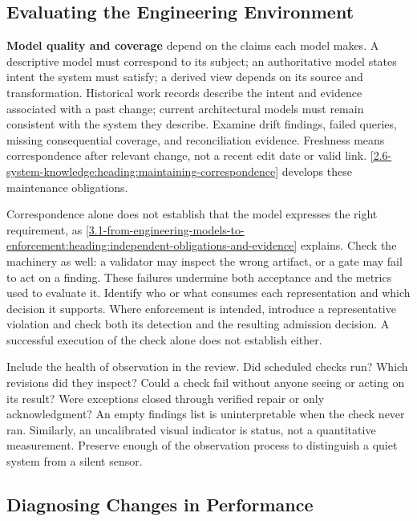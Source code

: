 \subsection{Evaluating the Engineering Environment}\label{heading:evaluating-the-engineering-environment}

\textbf{Model quality and coverage} depend on the claims each model makes. A descriptive model must correspond to its subject; an authoritative model states intent the system must satisfy; a derived view depends on its source and transformation. Historical work records describe the intent and evidence associated with a past change; current architectural models must remain consistent with the system they describe. Examine drift findings, failed queries, missing consequential coverage, and reconciliation evidence. Freshness means correspondence after relevant change, not a recent edit date or valid link. \autoref{2.6-system-knowledge:heading:maintaining-correspondence} develops these maintenance obligations.

Correspondence alone does not establish that the model expresses the right requirement, as \autoref{3.1-from-engineering-models-to-enforcement:heading:independent-obligations-and-evidence} explains. Check the machinery as well: a validator may inspect the wrong artifact, or a gate may fail to act on a finding. These failures undermine both acceptance and the metrics used to evaluate it. Identify who or what consumes each representation and which decision it supports. Where enforcement is intended, introduce a representative violation and check both its detection and the resulting admission decision. A successful execution of the check alone does not establish either.

Include the health of observation in the review. Did scheduled checks run? Which revisions did they inspect? Could a check fail without anyone seeing or acting on its result? Were exceptions closed through verified repair or only acknowledgment? An empty findings list is uninterpretable when the check never ran. Similarly, an uncalibrated visual indicator is status, not a quantitative measurement. Preserve enough of the observation process to distinguish a quiet system from a silent sensor.

\subsection{Diagnosing Changes in Performance}\label{heading:diagnosing-changes-in-performance}

